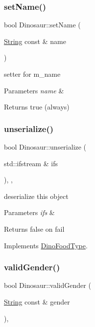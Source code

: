 \subsubsection{\texorpdfstring{set\+Name()}{setName()}}
{\footnotesize\ttfamily bool Dinosaur\+::set\+Name (\begin{DoxyParamCaption}\item[{\hyperlink{classString}{String} const \&}]{name }\end{DoxyParamCaption})}

setter for m\+\_\+name 
\begin{DoxyParams}{Parameters}
{\em name} & \\
\hline
\end{DoxyParams}
\begin{DoxyReturn}{Returns}
true (always) 
\end{DoxyReturn}
\mbox{\label{classDinosaur_aa84990b3102df65a9573117dec077518}} 
\subsubsection{\texorpdfstring{unserialize()}{unserialize()}}
{\footnotesize\ttfamily bool Dinosaur\+::unserialize (\begin{DoxyParamCaption}\item[{std\+::ifstream \&}]{ifs }\end{DoxyParamCaption})\hspace{0.3cm}{\ttfamily [final]}, {\ttfamily [override]}, {\ttfamily [virtual]}}

deserialize this object 
\begin{DoxyParams}{Parameters}
{\em ifs} & \\
\hline
\end{DoxyParams}
\begin{DoxyReturn}{Returns}
false on fail 
\end{DoxyReturn}


Implements \hyperlink{classDinoFoodType_a05018adfc6e5cbf1e7a28d77eab5cf84}{Dino\+Food\+Type}.

\mbox{\label{classDinosaur_ac307419cb074f2919f76abdf0e0c2b3e}} 
\subsubsection{\texorpdfstring{valid\+Gender()}{validGender()}}
{\footnotesize\ttfamily bool Dinosaur\+::valid\+Gender (\begin{DoxyParamCaption}\item[{\hyperlink{classString}{String} const \&}]{gender }\end{DoxyParamCaption})\hspace{0.3cm}{\ttfamily [static]}, {\ttfamily [private]}}

